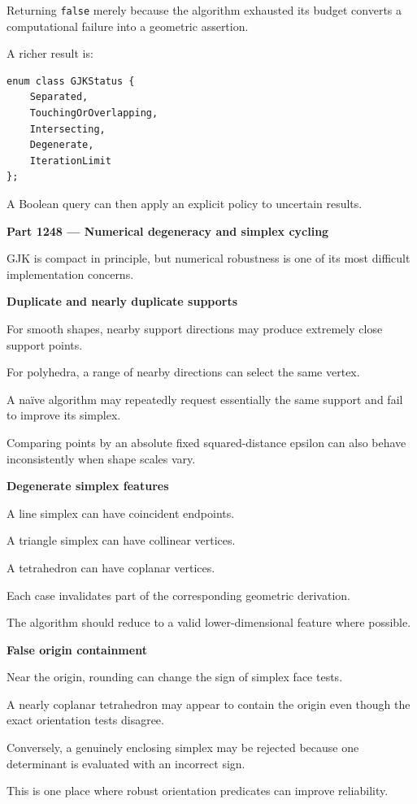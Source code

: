 Returning \texttt{false} merely because the algorithm exhausted its budget converts a computational failure into a geometric assertion.

A richer result is:

\begin{verbatim}
enum class GJKStatus {
    Separated,
    TouchingOrOverlapping,
    Intersecting,
    Degenerate,
    IterationLimit
};
\end{verbatim}

A Boolean query can then apply an explicit policy to uncertain results.

\textbf{Part 1248 --- Numerical degeneracy and simplex cycling}

GJK is compact in principle, but numerical robustness is one of its most difficult implementation concerns.

\textbf{Duplicate and nearly duplicate supports}

For smooth shapes, nearby support directions may produce extremely close support points.

For polyhedra, a range of nearby directions can select the same vertex.

A naïve algorithm may repeatedly request essentially the same support and fail to improve its simplex.

Comparing points by an absolute fixed squared-distance epsilon can also behave inconsistently when shape scales vary.

\textbf{Degenerate simplex features}

A line simplex can have coincident endpoints.

A triangle simplex can have collinear vertices.

A tetrahedron can have coplanar vertices.

Each case invalidates part of the corresponding geometric derivation.

The algorithm should reduce to a valid lower-dimensional feature where possible.

\textbf{False origin containment}

Near the origin, rounding can change the sign of simplex face tests.

A nearly coplanar tetrahedron may appear to contain the origin even though the exact orientation tests disagree.

Conversely, a genuinely enclosing simplex may be rejected because one determinant is evaluated with an incorrect sign.

This is one place where robust orientation predicates can improve reliability.

